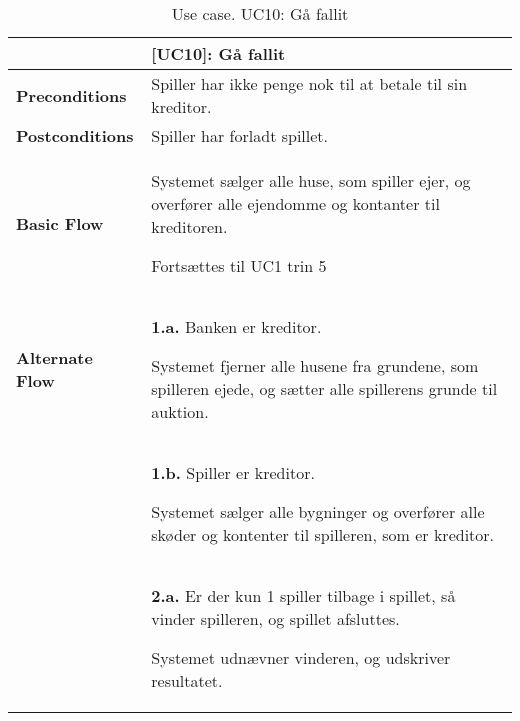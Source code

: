 \documentclass[class=article, crop=false]{standalone}
\begin{document}
    \begin{table}[H]
        \caption{Use case. UC10: Gå fallit}
        \begin{tabularx}{\textwidth}{|l|X|}
            \hline
            & \textbf{[UC10]: Gå fallit}   \\ \hline
            \textbf{Preconditions}       & Spiller har ikke penge nok til at betale til sin kreditor.\\ \hline
            \textbf{Postconditions}      & Spiller har forladt spillet. \\ \hline


            \textbf{Basic Flow} & \begin{tabenum}
                                      \item Systemet sælger alle huse, som spiller ejer, og overfører alle ejendomme og kontanter til kreditoren.
                                      \item Fortsættes til UC1 trin 5
            \end{tabenum}   \\ \hline




            \textbf{Alternate Flow}   & \textbf{1.a.} Banken er kreditor.
            \begin{enumerate} \begin{tabenum}
                                  \item Systemet fjerner alle husene fra grundene, som spilleren ejede, og sætter alle spillerens grunde til auktion.
            \end{tabenum} \end{enumerate}
            \\


                                    & \textbf{1.b.} Spiller er kreditor.
            \begin{enumerate} \begin{tabenum}
                                  \item Systemet sælger alle bygninger og overfører alle skøder og kontenter til spilleren, som er kreditor.
            \end{tabenum} \end{enumerate}
            \\

            & \textbf{2.a.} Er der kun 1 spiller tilbage i spillet, så vinder spilleren, og spillet afsluttes.
            \begin{enumerate} \begin{tabenum}
                                  \item Systemet udnævner vinderen, og udskriver resultatet.
            \end{tabenum} \end{enumerate}



            \hline

        \end{tabularx}


    \end{table}
\end{document}
